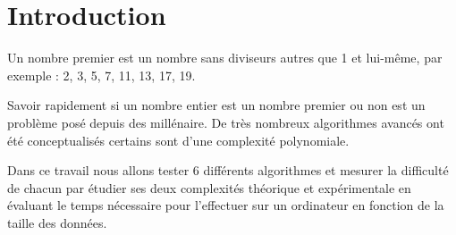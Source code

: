 \chapter{Introduction}

Un nombre premier est un nombre sans diviseurs autres que 1 et lui-même, par exemple : 2, 3, 5, 7, 11, 13, 17, 19. 
\par
Savoir rapidement si un nombre entier est un nombre premier ou non est un problème posé depuis des millénaire. De très nombreux algorithmes avancés ont été conceptualisés certains sont d'une complexité polynomiale.
\par
Dans ce travail nous allons tester 6 différents algorithmes et mesurer la difficulté de chacun par étudier ses deux complexités théorique et expérimentale en évaluant le temps nécessaire pour l'effectuer sur un ordinateur en fonction de la taille des données.
\\

